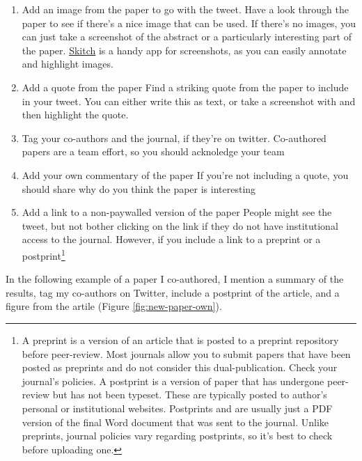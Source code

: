 \documentclass[]{book}
\let\rmarkdownfootnote\footnote%
\def\footnote{\protect\rmarkdownfootnote}
\begin{document}
\begin{enumerate}
\def\labelenumi{\arabic{enumi}.}
\item
  Add an image from the paper to go with the tweet.
  Have a look through the paper to see if there's a nice image that can be used. If there's no images, you can just take a screenshot of the abstract or a particularly interesting part of the paper. \href{https://evernote.com/products/skitch}{Skitch} is a handy app for screenshots, as you can easily annotate and highlight images.
\item
  Add a quote from the paper
  Find a striking quote from the paper to include in your tweet. You can either write this as text, or take a screenshot with and then highlight the quote.
\item
  Tag your co-authors and the journal, if they're on twitter.
  Co-authored papers are a team effort, so you should acknoledge your team
\item
  Add your own commentary of the paper
  If you're not including a quote, you should share why do you think the paper is interesting
\item
  Add a link to a non-paywalled version of the paper
  People might see the tweet, but not bother clicking on the link if they do not have institutional access to the journal. However, if you include a link to a preprint or a postprint\footnote{A preprint is a version of an article that is posted to a preprint repository before peer-review. Most journals allow you to submit papers that have been posted as preprints and do not consider this dual-publication. Check your journal's policies. A postprint is a version of paper that has undergone peer-review but has not been typeset. These are typically posted to author's personal or institutional websites. Postprints and are usually just a PDF version of the final Word document that was sent to the journal. Unlike preprints, journal policies vary regarding postprints, so it's best to check before uploading one.}
\end{enumerate}

In the following example of a paper I co-authored, I mention a summary of the results, tag my co-authors on Twitter, include a postprint of the article, and a figure from the artile (Figure \ref{fig:new-paper-own}).
\end{document}
